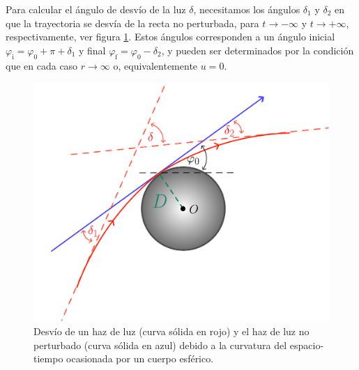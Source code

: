 \documentclass[letterpaper,11pt]{article}
\begin{document}
Para calcular el ángulo de desvío de la luz $\delta$, necesitamos los ángulos $\delta_1$ y $\delta_2$ en que la trayectoria se desvía de la recta no perturbada, para $t \to - \infty$ y $t \to +\infty$, respectivamente, ver figura \ref{fig:rayo-luz-GR}. Estos ángulos corresponden a un ángulo inicial $\varphi_{\text{i}} = \varphi_0 + \pi + \delta_1$ y final $\varphi_{\text{f}} = \varphi_0 - \delta_2$, y pueden ser determinados por la condición que en cada caso $r \to \infty$ o, equivalentemente $u = 0$.
\begin{figure}
\centering
\includegraphics[scale=0.5]{Desvio-Luz}
\caption{Desvío de un haz de luz (curva sólida en rojo) y el haz de luz no perturbado (curva sólida en azul) debido a la curvatura del espacio-tiempo ocasionada por un cuerpo esférico. }
\label{fig:rayo-luz-GR}
\end{figure}
\end{document}
